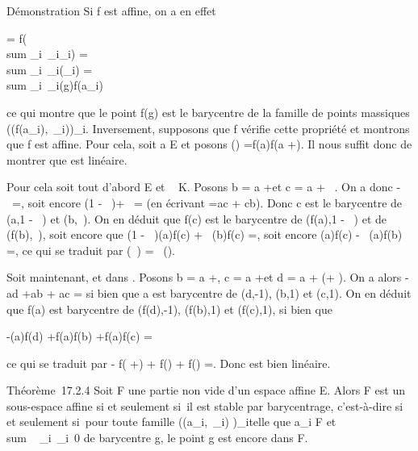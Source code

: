 \documentclass[]{article}
\begin{document}
Démonstration Si f est affine, on a en effet

 =\vec
f(\\sum
\_i\inI\lambda~\_i\overrightarrowga\_i)
= \\sum
\_i\inI\lambda~\_i\vecf(\overrightarrowga\_i)
= \\sum
\_i\inI\lambda~\_i\overrightarrowf(g)f(a\_i)

ce qui montre que le point f(g) est le barycentre de la famille de
points massiques \left
((f(a\_i),\lambda~\_i)\right )\_i\inI.
Inversement, supposons que f vérifie cette propriété et montrons que f
est affine. Pour cela, soit a \in E et posons
\vecf(\overrightarrow\xi)
=\overrightarrow f(a)f(a
+\overrightarrow \xi). Il nous suffit donc de montrer
que \vecf est linéaire.

Pour cela soit tout d'abord \overrightarrow\xi
\in\overrightarrow E et \lambda~ \in K. Posons b = a
+\overrightarrow \xi et c = a +
\lambda~\overrightarrow\xi. On a donc
\overrightarrowac -
\lambda~\overrightarrowab =, soit encore (1 - \lambda~)\overrightarrowac +
\lambda~\overrightarrowbc = (en écrivant \overrightarrowab
=\overrightarrow ac +\overrightarrow
cb). Donc c est le barycentre de (a,1 - \lambda~) et (b,\lambda~). On en déduit que
f(c) est le barycentre de (f(a),1 - \lambda~) et de (f(b),\lambda~), soit encore que
(1 - \lambda~)\overrightarrowf(a)f(c) +
\lambda~\overrightarrowf(b)f(c)
=, soit encore
\overrightarrowf(a)f(c) -
\lambda~\overrightarrowf(a)f(b)
=, ce qui se traduit par
\vecf(\lambda~\overrightarrow\xi) =
\lambda~\vecf(\overrightarrow\xi).

Soit maintenant, \overrightarrow\xi et
\overrightarrow\eta dans
\overrightarrowE. Posons b = a
+\overrightarrow \xi, c = a
+\overrightarrow \eta et d = a +
(\overrightarrow\xi +\overrightarrow
\eta). On a alors -\overrightarrow ad
+\overrightarrow ab +\overrightarrow
ac = si bien que a est barycentre
de (d,-1), (b,1) et (c,1). On en déduit que f(a) est barycentre de
(f(d),-1), (f(b),1) et (f(c),1), si bien que

-\overrightarrowf(a)f(d)
+\overrightarrow f(a)f(b)
+\overrightarrow f(a)f(c)
=

ce qui se traduit par -\vec
f(\overrightarrow\xi
+\overrightarrow \eta) +\vec
f(\overrightarrow\xi) +\vec
f(\overrightarrow\eta)
=. Donc \vecf est
bien linéaire.

Théorème~17.2.4 Soit F une partie non vide d'un espace affine E. Alors F
est un sous-espace affine si et seulement si~il est stable par
barycentrage, c'est-à-dire si et seulement si~pour toute famille
\left ((a\_i,\lambda~\_i)\right
)\_i\inI telle que a\_i \in F et
\\sum ~
\_i\inI\lambda~\_i\neq~0 de barycentre g, le
point g est encore dans F.
\end{document}
